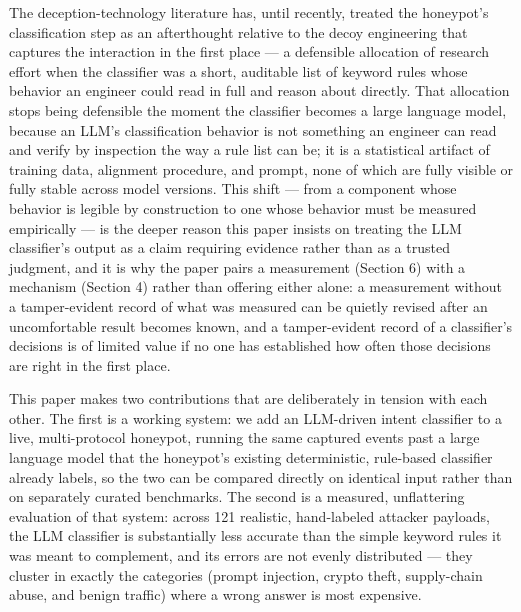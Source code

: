 \documentclass[journal,10pt,twocolumn]{IEEEtran}
\begin{document}
The deception-technology literature has, until recently, treated the honeypot's classification step as an afterthought relative to the decoy engineering that captures the interaction in the first place --- a defensible allocation of research effort when the classifier was a short, auditable list of keyword rules whose behavior an engineer could read in full and reason about directly. That allocation stops being defensible the moment the classifier becomes a large language model, because an LLM's classification behavior is not something an engineer can read and verify by inspection the way a rule list can be; it is a statistical artifact of training data, alignment procedure, and prompt, none of which are fully visible or fully stable across model versions. This shift --- from a component whose behavior is legible by construction to one whose behavior must be measured empirically --- is the deeper reason this paper insists on treating the LLM classifier's output as a claim requiring evidence rather than as a trusted judgment, and it is why the paper pairs a measurement (Section 6) with a mechanism (Section 4) rather than offering either alone: a measurement without a tamper-evident record of what was measured can be quietly revised after an uncomfortable result becomes known, and a tamper-evident record of a classifier's decisions is of limited value if no one has established how often those decisions are right in the first place.

This paper makes two contributions that are deliberately in tension with each other. The first is a working system: we add an LLM-driven intent classifier to a live, multi-protocol honeypot, running the same captured events past a large language model that the honeypot's existing deterministic, rule-based classifier already labels, so the two can be compared directly on identical input rather than on separately curated benchmarks. The second is a measured, unflattering evaluation of that system: across 121 realistic, hand-labeled attacker payloads, the LLM classifier is substantially less accurate than the simple keyword rules it was meant to complement, and its errors are not evenly distributed --- they cluster in exactly the categories (prompt injection, crypto theft, supply-chain abuse, and benign traffic) where a wrong answer is most expensive.
\end{document}
